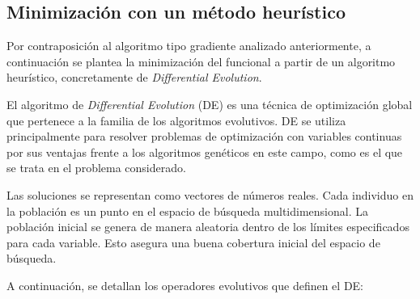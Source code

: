 \subsection{Minimización con un método heurístico}

Por contraposición al algoritmo tipo gradiente analizado anteriormente, a continuación se plantea la minimización del funcional a partir de un algoritmo heurístico, concretamente de \textit{Differential Evolution}\cite{DE_alg}.

El algoritmo de \textit{Differential Evolution} (DE) es una técnica de optimización global que pertenece a la familia de los algoritmos evolutivos. DE se utiliza principalmente para resolver problemas de optimización con variables continuas por sus ventajas frente a los algoritmos genéticos en este campo, como es el que se trata en el problema considerado.

Las soluciones se representan como vectores de números reales. Cada individuo en la población es un punto en el espacio de búsqueda multidimensional. La población inicial se genera de manera aleatoria dentro de los límites especificados para cada variable. Esto asegura una buena cobertura inicial del espacio de búsqueda.

A continuación, se detallan los operadores evolutivos que definen el DE:

